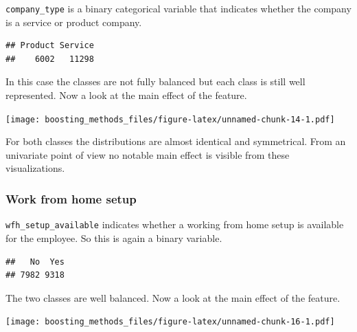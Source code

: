 \documentclass[
]{book}
\newenvironment{Shaded}{\begin{snugshade}}{\end{snugshade}}
\newcommand{\CommentTok}[1]{\textcolor[rgb]{0.56,0.35,0.01}{\textit{#1}}}
\newcommand{\FunctionTok}[1]{\textcolor[rgb]{0.00,0.00,0.00}{#1}}
\newcommand{\NormalTok}[1]{#1}
\newcommand{\SpecialCharTok}[1]{\textcolor[rgb]{0.00,0.00,0.00}{#1}}
\begin{document}
\texttt{company\_type} is a binary categorical variable that indicates whether the company is a service or product company.

\begin{Shaded}
\end{Shaded}

\begin{verbatim}
## Product Service 
##    6002   11298
\end{verbatim}

In this case the classes are not fully balanced but each class is still well represented. Now a look at the main effect of the feature.

\texttt{[image: boosting\_methods\_files/figure-latex/unnamed-chunk-14-1.pdf]}

For both classes the distributions are almost identical and symmetrical. From an univariate point of view no notable main effect is visible from these visualizations.

\hypertarget{work-from-home-setup}{%
\subsubsection{Work from home setup}\label{work-from-home-setup}}

\texttt{wfh\_setup\_available} indicates whether a working from home setup is available for the employee. So this is again a binary variable.

\begin{Shaded}
\end{Shaded}

\begin{verbatim}
##   No  Yes 
## 7982 9318
\end{verbatim}

The two classes are well balanced. Now a look at the main effect of the feature.

\texttt{[image: boosting\_methods\_files/figure-latex/unnamed-chunk-16-1.pdf]}
\end{document}
